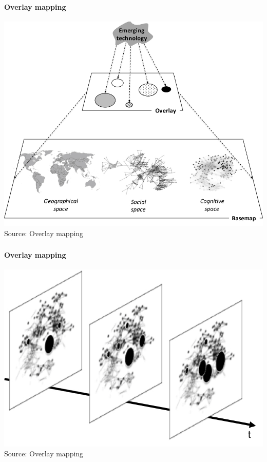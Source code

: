\documentclass[8pt]{beamer}
\begin{document}
\begin{frame}

\frametitle{\insertsection}
\framesubtitle{Overlay mapping}
\centering
\includegraphics[width=\linewidth,height=0.75\textheight,keepaspectratio]{overlaymaps1}\\        
\tiny{Source: Overlay mapping \cite{Rotolo2017}}

\end{frame}

\begin{frame}

\frametitle{\insertsection}
\framesubtitle{Overlay mapping}
\centering
\includegraphics[width=\linewidth,height=0.50\textheight,keepaspectratio]{overlaymaps2}\\
\tiny{Source: Overlay mapping \cite{Rotolo2017}}

\end{frame}
\end{document}
